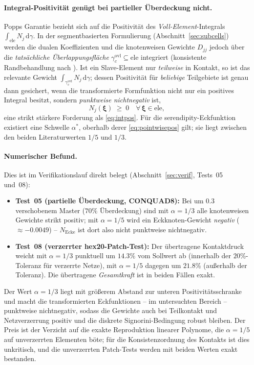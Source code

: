 \documentclass[a4paper,11pt]{article}
\def\tfrac#1#2{#1/#2}%
\def\tilde#1{#1}%
\begin{document}
\paragraph{Integral-Positivität genügt bei partieller Überdeckung nicht.}
Popps Garantie bezieht sich auf die Positivität des \emph{Voll-Element}-Integrals
$\int_{\text{ele}}\tilde N_j\,\mathrm d\gamma$. In der segmentbasierten Formulierung
(Abschnitt~\ref{sec:subcells}) werden die dualen Koeffizienten und die knotenweisen Gewichte
$\tilde D_{jj}$ jedoch über die \emph{tatsächliche Überlappungsfläche} $\gamma_c^{\text{ovl}}\subseteq
\text{ele}$ integriert (konsistente Randbehandlung nach \citet{cichosz}). Ist ein Slave-Element
nur \emph{teilweise} in Kontakt, so ist das relevante Gewicht
$\int_{\gamma_c^{\text{ovl}}}\tilde N_j\,\mathrm d\gamma$; dessen Positivität für \emph{beliebige}
Teilgebiete ist genau dann gesichert, wenn die transformierte Formfunktion nicht nur ein positives
Integral besitzt, sondern \emph{punktweise nichtnegativ} ist,
\begin{equation}
\tilde N_j(\boldsymbol\xi) \;\ge\; 0 \quad \forall\,\boldsymbol\xi\in\text{ele},
\label{eq:pointwisepos}
\end{equation}
eine strikt stärkere Forderung als \eqref{eq:intpos}. Für die serendipity-Eckfunktion existiert eine
Schwelle $\alpha^\ast$, oberhalb derer \eqref{eq:pointwisepos} gilt; sie liegt zwischen den beiden
Literaturwerten $\tfrac15$ und $\tfrac13$.

\paragraph{Numerischer Befund.}
Dies ist im Verifikationslauf direkt belegt (Abschnitt~\ref{sec:verif}, Tests~05 und~08):
\begin{itemize}\itemsep2pt
  \item \textbf{Test~05 (partielle Überdeckung, CONQUAD8):} Bei um $0.3$ verschobenem Master
        ($70\%$ Überdeckung) sind mit $\alpha=\tfrac13$ alle knotenweisen Gewichte strikt positiv;
        mit $\alpha=\tfrac15$ wird ein Eckknoten-Gewicht \emph{negativ} ($\approx-0.0049$) --
        $\tilde N_{\text{Ecke}}$ ist dort also nicht punktweise nichtnegativ.
  \item \textbf{Test~08 (verzerrter hex20-Patch-Test):} Der übertragene Kontaktdruck weicht mit
        $\alpha=\tfrac13$ punktuell um $14.3\%$ vom Sollwert ab (innerhalb der $20\%$-Toleranz für
        verzerrte Netze), mit $\alpha=\tfrac15$ dagegen um $21.8\%$ (außerhalb der Toleranz). Die
        übertragene \emph{Gesamtkraft} ist in beiden Fällen exakt.
\end{itemize}
Der Wert $\alpha=\tfrac13$ liegt mit größerem Abstand zur unteren Positivitätsschranke und macht die
transformierten Eckfunktionen -- im untersuchten Bereich -- punktweise nichtnegativ, sodass die
Gewichte auch bei Teilkontakt und Netzverzerrung positiv und die diskrete Signorini-Bedingung robust
bleiben. Der Preis ist der Verzicht auf die exakte Reproduktion linearer Polynome, die $\alpha=\tfrac15$
auf unverzerrten Elementen böte; für die Konsistenzordnung des Kontakts ist dies unkritisch, und die
unverzerrten Patch-Tests werden mit beiden Werten exakt bestanden.
\end{document}
